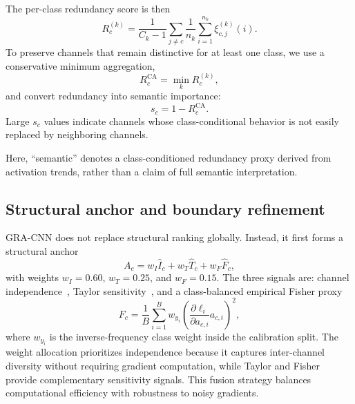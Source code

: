 \documentclass[preprint,12pt]{elsarticle}
\begin{document}
The per-class redundancy score is then
\begin{equation}
R_c^{(k)}=\frac{1}{C_k-1}\sum_{j\neq c}\frac{1}{n_k}\sum_{i=1}^{n_k}\xi_{c,j}^{(k)}(i).
\label{eq:ivc_class_redundancy}
\end{equation}
To preserve channels that remain distinctive for at least one class, we use a conservative minimum aggregation,
\begin{equation}
R_c^{\mathrm{CA}}=\min_k R_c^{(k)},
\label{eq:ivc_ca_redundancy}
\end{equation}
and convert redundancy into semantic importance:
\begin{equation}
s_c = 1 - R_c^{\mathrm{CA}}.
\label{eq:ivc_semantic_importance}
\end{equation}
Large $s_c$ values indicate channels whose class-conditional behavior is not easily replaced by neighboring channels.

Here, ``semantic'' denotes a class-conditioned redundancy proxy derived from activation trends, rather than a claim of full semantic interpretation.

\subsection{Structural anchor and boundary refinement}

GRA-CNN does not replace structural ranking globally. Instead, it first forms a structural anchor
\begin{equation}
A_c = w_I \hat{I}_c + w_T \hat{T}_c + w_F \hat{F}_c,
\label{eq:ivc_anchor}
\end{equation}
with weights $w_I=0.60$, $w_T=0.25$, and $w_F=0.15$. The three signals are: channel independence~\cite{sui2021chip}, Taylor sensitivity~\cite{molchanov2019taylor}, and a class-balanced empirical Fisher proxy
\begin{equation}
F_c=\frac{1}{B}\sum_{i=1}^{B} w_{y_i}
\left(\frac{\partial \ell_i}{\partial a_{c,i}} a_{c,i}\right)^2,
\label{eq:ivc_fisher}
\end{equation}
where $w_{y_i}$ is the inverse-frequency class weight inside the calibration split. The weight allocation prioritizes independence because it captures inter-channel diversity without requiring gradient computation, while Taylor and Fisher provide complementary sensitivity signals. This fusion strategy balances computational efficiency with robustness to noisy gradients.
\end{document}
